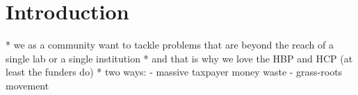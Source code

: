 \section{Introduction}


* we as a community want to tackle problems that are beyond the reach of a
  single lab or a single institution
* and that is why we love the HBP and HCP (at least the funders do)
* two ways:
  - massive taxpayer money waste
  - grass-roots movement



